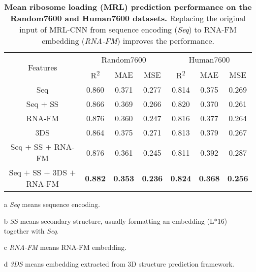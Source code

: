 \begin{table}[!t]
\centering
\caption{\textbf{Mean ribosome loading (MRL) prediction performance on the Random7600 and Human7600 datasets.} Replacing the original input of MRL-CNN from sequence encoding (\textit{Seq}) to RNA-FM embedding (\textit{RNA-FM}) improves the performance.}
\label{Tab.utr}
\begin{threeparttable}

\begin{tabular}{ccccccc} 
\toprule
\multirow{2}{*}{Features} &\multicolumn{3}{c}{Random7600} &\multicolumn{3}{c}{Human7600} \\
\cmidrule(r){2-4}\cmidrule(lr){5-7}
& R\textsuperscript{2} & MAE & MSE & R\textsuperscript{2} & MAE   & MSE \\ 
\midrule
Seq\tnote{a} &  0.860  & 0.371 & 0.277 &  0.814 & 0.375 & 0.269  \\ 
Seq $+$ SS\tnote{b} & 0.866 & 0.369 & 0.266 & 0.820& 0.370 & 0.261  \\ 
RNA-FM\tnote{c} & 0.876 & 0.360 & 0.247 & 0.816 & 0.377 & 0.264  \\ 
3DS\tnote{d} & 0.864 & 0.375 & 0.271 & 0.813 & 0.379 & 0.267 \\
Seq $+$ SS $+$ RNA-FM & 0.876 & 0.361 & 0.245 & 0.811 & 0.392 & 0.287  \\
Seq $+$ SS $+$ 3DS $+$ RNA-FM  & \textbf{0.882} & \textbf{0.353} & \textbf{0.236} & \textbf{0.824} & \textbf{0.368} & \textbf{0.256}  \\
\bottomrule
\end{tabular}

\begin{tablenotes}
        \footnotesize
        \item[a] \textit{Seq} means sequence encoding.
        \item[b] \textit{SS} means secondary structure, usually formatting an embedding (L$*$16) together with \textit{Seq}.
        \item[c] \textit{RNA-FM} means RNA-FM embedding.
        \item[d] \textit{3DS} means embedding extracted from 3D structure prediction framework.
      \end{tablenotes}
      
\end{threeparttable}


\end{table}